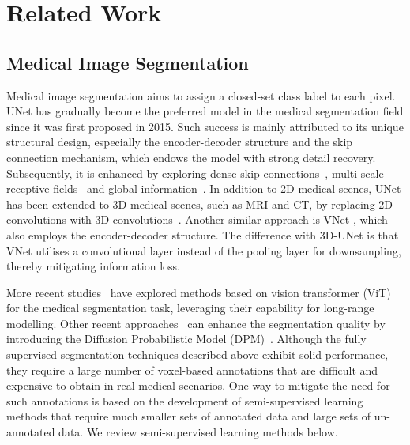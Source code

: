 \section{Related Work}
\label{sec:Related Work}

\subsection{Medical Image Segmentation}

Medical image segmentation aims to assign a closed-set class label to each pixel. UNet \citep{ronneberger2015u} has gradually become the preferred model in the medical segmentation field since it was first proposed in 2015. Such success is mainly attributed to its unique structural design, especially the encoder-decoder structure and the skip connection mechanism, which endows the model with strong detail recovery. Subsequently, it is enhanced by exploring dense skip connections~\citep{guan2019fully,zhou2018unet++}, multi-scale receptive fields~\citep{xiao2018weighted} and global information~\citep{chen2021transunet}. 
In addition to 2D medical scenes, UNet has been extended to 3D medical scenes, such as MRI and CT, by replacing 2D convolutions with 3D convolutions~\citep{cciccek20163d}. Another similar approach is VNet \citep{milletari2016v}, which also employs the encoder-decoder structure. The difference with 3D-UNet is that VNet utilises a convolutional layer instead of the pooling layer for downsampling, thereby mitigating information loss. 

More recent studies~\citep{10093768,horst2024cellvit} have explored methods based on vision transformer (ViT)~\citep{dosovitskiy2020image} for the medical segmentation task, leveraging their capability for long-range modelling. Other recent approaches~\citep{chowdary2023diffusion,wu2024medsegdiff} can enhance the segmentation quality by introducing the Diffusion Probabilistic Model (DPM)~\citep{ho2020denoising}. 
Although the fully supervised segmentation techniques described above exhibit solid performance, they require a large number of voxel-based annotations that are difficult and expensive to obtain in real medical scenarios. 
One way to mitigate the need for such annotations is based on the development of semi-supervised learning methods that require much smaller sets of annotated data and large sets of un-annotated data. We review semi-supervised learning methods below. 







